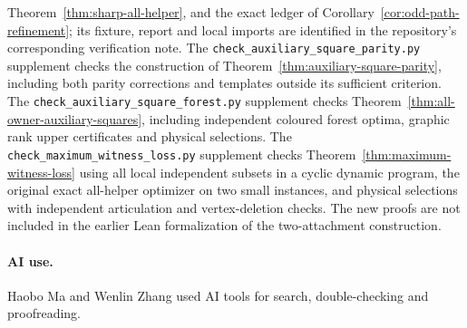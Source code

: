 \documentclass[11pt]{article}
\begin{document}
Theorem~\ref{thm:sharp-all-helper}, and the exact ledger of
Corollary~\ref{cor:odd-path-refinement}; its fixture, report and local imports
are identified in the repository's corresponding verification note.
The \texttt{check\_auxiliary\_square\_parity.py} supplement checks the
construction of Theorem~\ref{thm:auxiliary-square-parity}, including both
parity corrections and templates outside its sufficient criterion.
The \texttt{check\_auxiliary\_square\_forest.py} supplement checks
Theorem~\ref{thm:all-owner-auxiliary-squares}, including independent coloured
forest optima, graphic rank upper certificates and physical selections.
The \texttt{check\_maximum\_witness\_loss.py} supplement checks
Theorem~\ref{thm:maximum-witness-loss} using all local independent subsets
in a cyclic dynamic program, the original exact all-helper optimizer on two
small instances, and physical selections with independent articulation and
vertex-deletion checks.
The new proofs are not included in the earlier Lean formalization of the two-attachment
construction.

\paragraph{AI use.}
Haobo Ma and Wenlin Zhang used AI tools for search, double-checking and proofreading.
\end{document}
